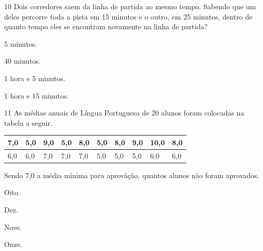\num{10} Dois corredores saem da linha de partida ao mesmo tempo. Sabendo que
um deles percorre toda a pista em 15 minutos e o outro, em 25 minutos,
dentro de quanto tempo eles se encontram novamente na linha de partida?

\begin{escolha}
\item 5 minutos.
\item 40 minutos.
\item 1 hora e 5 minutos.
\item 1 hora e 15 minutos.
\end{escolha}







\pagebreak

\num{11} As médias anuais de Língua Portuguesa de 20 alunos foram colocadas na tabela a seguir.


\begin{longtable}[]{@{}llllllllll@{}}
\toprule
7,0 & 5,0 & 9,0 & 5,0 & 8,0 & 5,0 & 8,0 & 9,0 & 10,0 &
8,0\tabularnewline
\midrule
\endhead
6,0 & 6,0 & 7,0 & 7,0 & 7,0 & 5,0 & 5,0 & 5,0 & 6,0 & 6,0\tabularnewline
\bottomrule
\end{longtable}

Sendo 7,0 a média mínima para aprovãção, quantos alunos não foram aprovados.

\begin{escolha}
\item Oito.
\item Dez.
\item Nove.
\item Onze.
\end{escolha}

